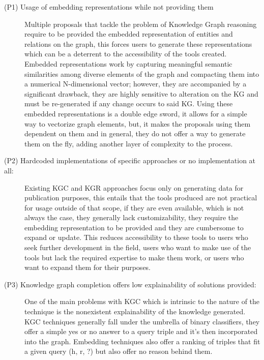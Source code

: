 \begin{description}
    \item[(P1) Usage of embedding representations while not providing them]
    Multiple proposals that tackle the problem of Knowledge Graph reasoning require to be provided the embedded representation of entities and relations on the graph, this forces users to generate these representations which can be a deterrent to the accessibility of the tools created. 
    Embedded representations work by capturing meaningful semantic similarities among diverse elements of the graph and compacting them into a numerical N-dimensional vector; however, they are accompanied by a significant drawback, they are highly sensitive to alteration on the KG and must be re-generated if any change occurs to said KG.
    Using these embedded representations is a double edge sword, it allows for a simple way to vectorize graph elements, but, it makes the proposals using them dependent on them and in general, they do not offer a way to generate them on the fly, adding another layer of complexity to the process.\\
    
    \item[(P2) Hardcoded implementations of specific approaches or no implementation at all:] Existing KGC and KGR approaches focus only on generating data for publication purposes, this entails that the tools produced are not practical for usage outside of that scope, if they are even available, which is not always the case, they generally lack customizability, they require the embedding representation to be provided and they are cumbersome to expand or update. This reduces accessibility to these tools to users who seek further development in the field, users who want to make use of the tools but lack the required expertise to make them work, or users who want to expand them for their purposes.\\
    
    \item[(P3) Knowledge graph completion offers low explainability of solutions provided:] One of the main problems with KGC which is intrinsic to the nature of the technique is the nonexistent explainability of the knowledge generated. KGC techniques generally fall under the umbrella of binary classifiers, they offer a simple yes or no answer to a query triple and it's then incorporated into the graph. Embedding techniques also offer a ranking of triples that fit a given query (h, r, ?) but also offer no reason behind them.\\ 
    

\end{description}
